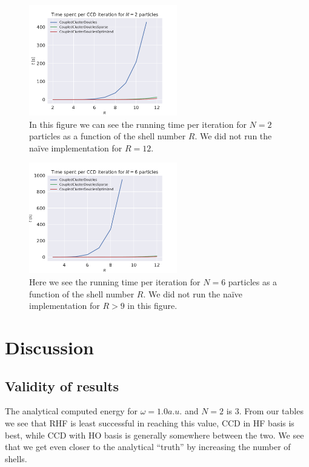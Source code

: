 \documentclass[
    a4paper, aps, twocolumn, floatfix, superscriptaddress,
    nofootinbib]{revtex4-1}
\newcommand{\1}{\mathds{1}}
\begin{document}
        \begin{figure}
            \centering
            \includegraphics[width=244px]
            {../dat/figures/iter_run_times_2.pdf}
            \caption{In this figure we can see the running time per iteration
            for $N = 2$ particles as a function of the shell number $R$. We did
            not run the naïve implementation for $R = 12$.}
            \label{fig:running_time_2}
        \end{figure}

        \begin{figure}
            \centering
            \includegraphics[width=244px]
            {../dat/figures/iter_run_times_6.pdf}
            \caption{Here we see the running time per iteration for $N = 6$
            particles as a function of the shell number $R$. We did not run the
            naïve implementation for $R > 9$ in this figure.}
            \label{fig:running_time_6}
        \end{figure}

\section{Discussion}

    \subsection{Validity of results}
        The analytical computed energy for $\omega=1.0a.u.$
        and $N=2$ is $3$\cite{taut1994two}. From our tables we see 
        that RHF is least successful in reaching this value, CCD in
        HF basis is best, while CCD with HO basis is generally somewhere 
        between the two. We see that we get even closer to the analytical
        ``truth'' by increasing the number of shells.
\end{document}

